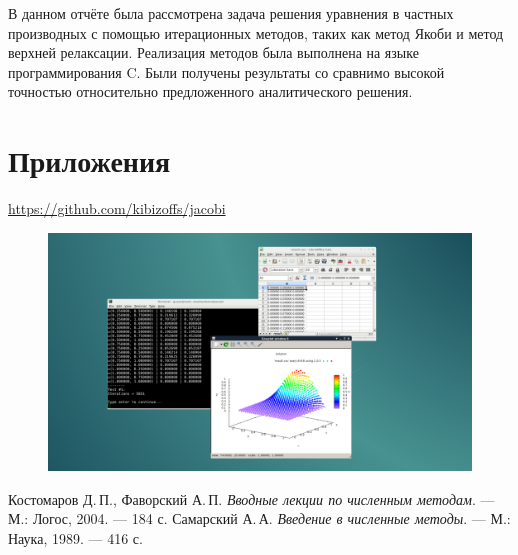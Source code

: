 \documentclass[a4paper, fleqn]{report}
\begin{document}
В данном отчёте была рассмотрена задача решения уравнения в частных производных с помощью итерационных методов, таких как метод Якоби и метод верхней релаксации. Реализация методов была выполнена на языке программирования C. Были получены результаты со сравнимо высокой точностью относительно предложенного аналитического решения.

\chapter*{Приложения}

\href{https://github.com/kibizoffs/jacobi}{https://github.com/kibizoffs/jacobi}
\begin{figure}[h]
    \centering
    \includegraphics[width=1\textwidth]{preview.png}
\end{figure}

\begin{thebibliography}{2}
\renewcommand{\bibname}{Литература}
Костомаров Д.\,П., Фаворский А.\,П. \textit{Вводные лекции по численным методам}. — М.: Логос, 2004. — 184 с.
Самарский А.\,А. \textit{Введение в численные методы}. — М.: Наука, 1989. — 416 с.
\end{thebibliography}
\end{document}
